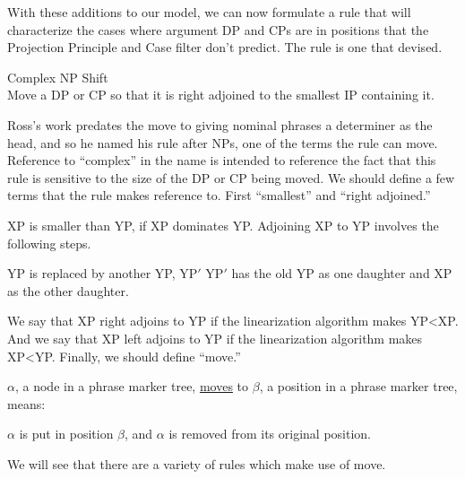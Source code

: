With these additions to our model, we can now formulate a rule that will characterize the cases where argument DP and CPs are in positions that the Projection Principle and Case filter don't predict. The rule is one that \citet{Ross:1967} devised.
\begin{exe}
	\raggedright
	\ex \label{ex3:hnps} Complex NP Shift\\
	Move a DP or CP so that it is right adjoined to the smallest IP containing it.
\end{exe}
Ross's work predates the move to giving nominal phrases a determiner as the head, and so he named his rule after NPs, one of the terms the rule can move. Reference to ``complex'' in the name is intended to reference the fact that this rule is sensitive to the size of the DP or CP being moved. We should define a few terms that the rule makes reference to. First ``smallest'' and ``right adjoined.''
\begin{exe}
	\raggedright
	\ex \label{ex3:smallest} 
	XP is smaller than YP, if XP dominates YP.
	\ex \label{ex3:rightadjoined}
	Adjoining XP to YP involves the following steps.
	\begin{xlist}
		\ex YP is replaced by another YP, YP$'$
		\ex YP$'$ has the old YP as one daughter and XP as the other daughter.
	\end{xlist}
\end{exe}
We say that XP right adjoins to YP if the linearization algorithm makes YP<XP. And we say that XP left adjoins to YP if the linearization algorithm makes XP<YP. Finally, we should define ``move.''
\begin{exe}
	\raggedright
	\ex \label{ex3:movedef} $\alpha$, a node in a phrase marker tree, \underline{moves} to $\beta$, a position in a phrase marker tree, means:
	\begin{xlist}
		\ex $\alpha$ is put in position $\beta$, and
		\ex $\alpha$ is removed from its original position.
	\end{xlist}
\end{exe}
We will see that there are a variety of rules which make use of move.
\pagebreak

